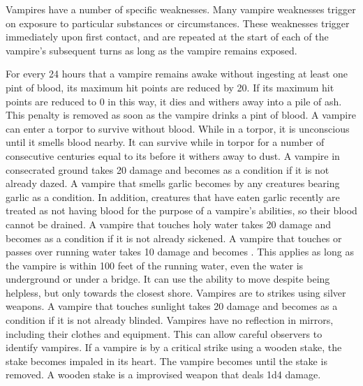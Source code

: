   Vampires have a number of specific weaknesses.
  Many vampire weaknesses trigger on exposure to particular substances or circumstances.
  These weaknesses trigger immediately upon first contact, and are repeated at the start of each of the vampire's subsequent turns as long as the vampire remains exposed.
  \begin{raggeditemize}
     For every 24 hours that a vampire remains awake without ingesting at least one pint of blood, its maximum hit points are reduced by 20.
      If its maximum hit points are reduced to 0 in this way, it dies and withers away into a pile of ash.
      This penalty is removed as soon as the vampire drinks a pint of blood.
      A vampire can enter a torpor to survive without blood.
      While in a torpor, it is unconscious until it smells blood nearby.
      It can survive while in torpor for a number of consecutive centuries equal to its  before it withers away to dust.
     A vampire in consecrated ground takes 20 damage and becomes \dazed as a condition if it is not already dazed.
     A vampire that smells garlic becomes \frightened by any creatures bearing garlic as a condition.
      In addition, creatures that have eaten garlic recently are treated as not having blood for the purpose of a vampire's abilities, so their blood cannot be drained.
     A vampire that touches holy water takes 20 damage and becomes \sickened as a condition if it is not already sickened.
     A vampire that touches or passes over running water takes 10 damage and \briefly becomes \helpless.
      This applies as long as the vampire is within 100 feet of the running water, even the water is underground or under a bridge.
      It can use the  ability to move despite being helpless, but only towards the closest shore.
     Vampires are \vulnerable to strikes using silver weapons.
     A vampire that touches sunlight takes 20 damage and becomes \blinded as a condition if it is not already blinded.
     Vampires have no reflection in mirrors, including their clothes and equipment.
      This can allow careful observers to identify vampires.
     If a vampire is  by a critical strike using a wooden stake, the stake becomes impaled in its heart.
      The vampire becomes \helpless until the stake is removed.
      A wooden stake is a  improvised weapon that deals 1d4 damage.
  \end{raggeditemize}


